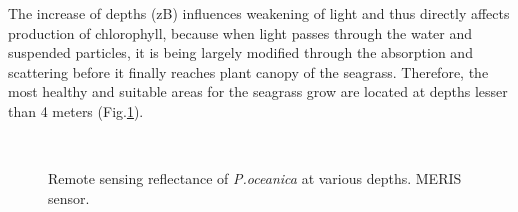 \documentclass[11pt]{article}
\begin{document}
The increase of depths (zB) influences weakening of light and thus directly affects
production of chlorophyll, because when light passes through the water and suspended particles, it is
being largely modified through the absorption and scattering before it finally reaches plant canopy of
the seagrass. Therefore, the most healthy and suitable areas for the seagrass grow are located at depths
lesser than 4 meters (Fig.\ref{fig:4.9}).

\begin{figure}[H]
	\centering
	\\
	\caption{Remote sensing reflectance of \textit{P.oceanica} at various depths. MERIS sensor.}
	\label{fig:4.9}
\end{figure}
\end{document}
